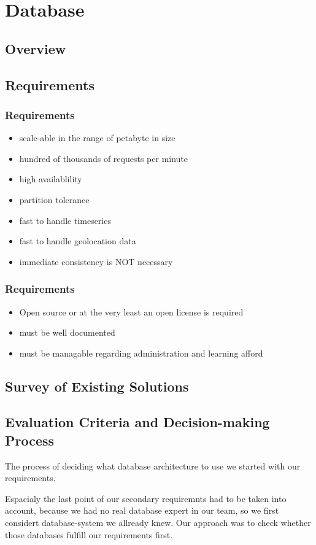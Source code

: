 \section{Database}
%
\subsection{Overview}
%
%
\subsection{Requirements}
\subsubsection{Requirements}
\begin{itemize}  
\item scale-able in the range of petabyte in size
\item hundred of thousands of requests per minute
\item high availablility
\item partition tolerance
\item fast to handle timeseries
\item fast to handle geolocation data
\item  immediate consistency is NOT necessary
\end{itemize}
%
\subsubsection{Requirements}
%
\begin{itemize}  
\item Open source or at the very least an open license is required
\item must be well documented
\item must be managable regarding administration and learning afford
\end{itemize}
\subsection{Survey of Existing Solutions}
%
%
\subsection{Evaluation Criteria and Decision-making Process}
The process of deciding what database architecture to use we started with our requirements. 

Espacialy the last point of our secondary requiremnts had to be taken into account, because we had no real database expert in our team, so we first considert database-system we allready knew.
Our approach was to check whether those databases fulfill our requirements first.


